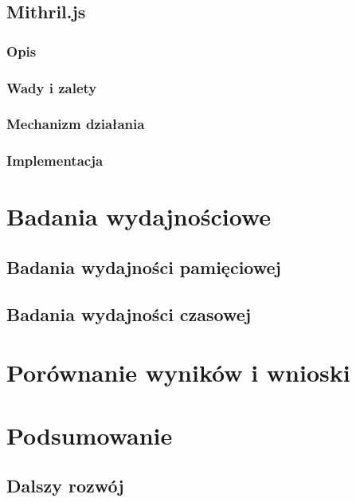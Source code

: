 \documentclass[polish, twoside, 12pt]{mwart}
\let\stdsection\section
\renewcommand*{\section}{\clearpage\stdsection}
\begin{document}
\subsection{Mithril.js}

\subsubsection{Opis}

\subsubsection{Wady i zalety}

\subsubsection{Mechanizm działania}

\subsubsection{Implementacja}

\section{Badania wydajnościowe}

\subsection{Badania wydajności pamięciowej}

\subsection{Badania wydajności czasowej}

\section{Porównanie wyników i wnioski}

\section{Podsumowanie}

\subsection{Dalszy rozwój}
\end{document}
